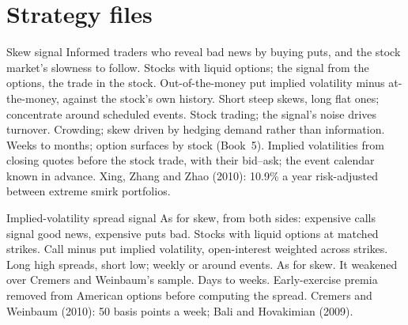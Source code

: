 \section{Strategy files}

\begin{strategyfile}{Skew signal}\label{strat:s1:options-implied-signals-for-stocks:skew}
 Informed traders who reveal bad news by buying puts, and the stock market's slowness to follow.
 Stocks with liquid options; the signal from the options, the trade in the stock.
 Out-of-the-money put implied volatility minus at-the-money, against the stock's own history.
 Short steep skews, long flat ones; concentrate around scheduled events.
 Stock trading; the signal's noise drives turnover.
 Crowding; skew driven by hedging demand rather than information.
 Weeks to months; option surfaces by stock (Book~5).
 Implied volatilities from closing quotes before the stock trade, with their bid--ask; the event calendar known in advance.
 Xing, Zhang and Zhao (2010): 10.9\% a year risk-adjusted between extreme smirk portfolios.
\end{strategyfile}

\begin{strategyfile}{Implied-volatility spread signal}\label{strat:s1:options-implied-signals-for-stocks:spread}
 As for skew, from both sides: expensive calls signal good news, expensive puts bad.
 Stocks with liquid options at matched strikes.
 Call minus put implied volatility, open-interest weighted across strikes.
 Long high spreads, short low; weekly or around events.
 As for skew.
 It weakened over Cremers and Weinbaum's sample.
 Days to weeks.
 Early-exercise premia removed from American options before computing the spread.
 Cremers and Weinbaum (2010): 50 basis points a week; Bali and Hovakimian (2009).
\end{strategyfile}

